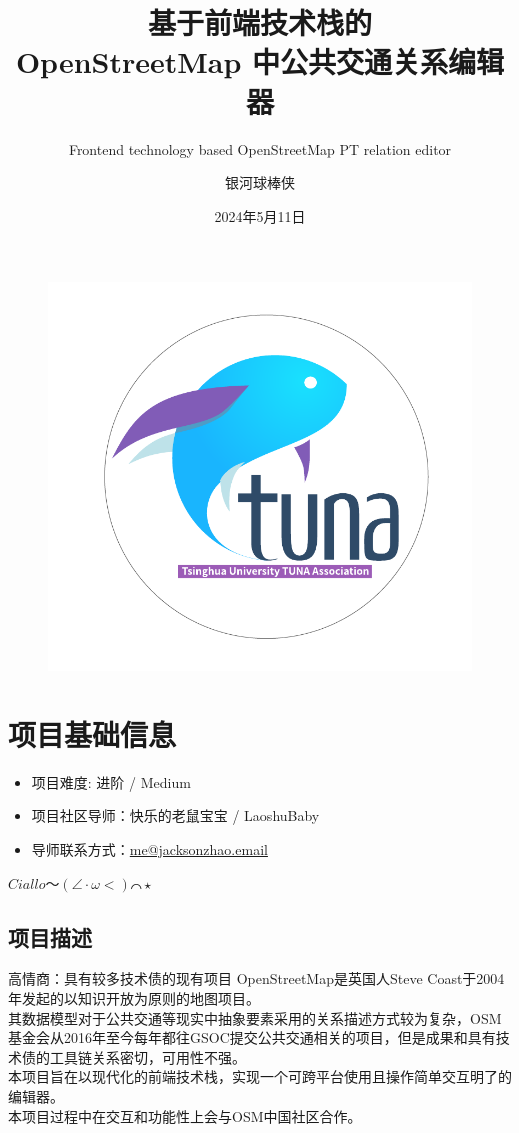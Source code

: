 \documentclass{beamer}
\author{银河球棒侠}
\title{基于前端技术栈的\\ OpenStreetMap 中公共交通关系编辑器}
\subtitle{Frontend technology based OpenStreetMap PT relation editor}
\institute{OSMChina}
\date{2024年5月11日}
\begin{document}
\kaishu
\begin{frame}
	\titlepage
	\begin{figure}[htpb]
		\begin{center}
			\includegraphics[width=0.2\linewidth]{figure/tuna.pdf}
		\end{center}
	\end{figure}
\end{frame}

\begin{frame}
	\tableofcontents[sectionstyle=show,subsectionstyle=show/shaded/hide,subsubsectionstyle=show/shaded/hide]
\end{frame}

\section{项目基础信息}

\begin{frame}
	\begin{itemize}
		\item 项目难度: 进阶 / Medium
		\item 项目社区导师：快乐的老鼠宝宝 / LaoshuBaby
		\item 导师联系方式：\href{mailto:me@jacksonzhao.email}{me@jacksonzhao.email}
	\end{itemize}
	\vspace{1.5em}
	$ Ciallo\text{～}(\angle\cdot\omega< )\text{⌒}\star $
\end{frame}

\subsection{项目描述}

\begin{frame}{高情商：具有较多技术债的现有项目}
	\quad \quad OpenStreetMap是英国人Steve Coast于2004年发起的以知识开放为原则的地图项目。\\
	\quad \quad 其数据模型对于公共交通等现实中抽象要素采用的关系描述方式较为复杂，OSM基金会从2016年至今每年都往GSOC提交公共交通相关的项目，但是成果和具有技术债的工具链关系密切，可用性不强。\\
	\quad \quad 本项目旨在以现代化的前端技术栈，实现一个可跨平台使用且操作简单交互明了的编辑器。\\
	\quad \quad 本项目过程中在交互和功能性上会与OSM中国社区合作。
\end{frame}
\end{document}
